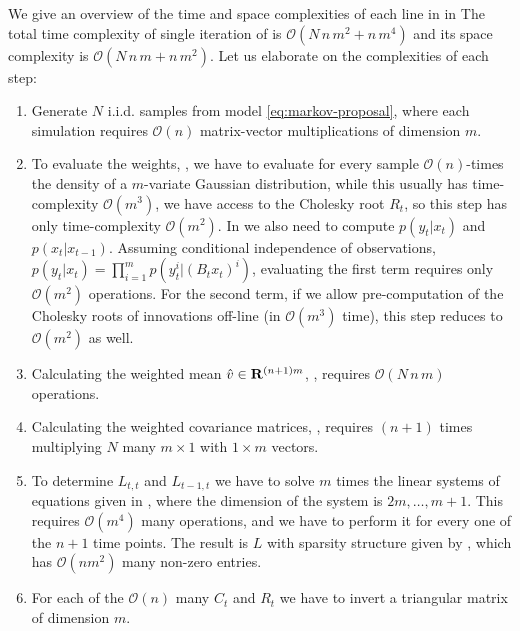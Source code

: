 We give an overview of the time and space complexities of each line in  in 
The total time complexity of single iteration of  is $\mathcal O \left( N\,n\,m^{2} + n\,m^{4}\right)$ and its space complexity is $\mathcal O \left( N\,n\,m + n\,m^{2}\right)$. Let us elaborate on the complexities of each step:
\begin{enumerate}
    \item[\Cref{step:cem-simulate}] Generate $N$ i.i.d. samples from model \eqref{eq:markov-proposal}, where each simulation requires $\mathcal O(n)$ matrix-vector multiplications of dimension $m$. 
    \item[\Cref{step:cem-weights}] To evaluate the weights, , we have to evaluate for every sample $\mathcal O(n)$-times the density of a $m$-variate Gaussian distribution, while this usually has time-complexity $\mathcal O(m^{3})$, we have access to the Cholesky root $R_{t}$, so this step has only time-complexity $\mathcal O(m^{2})$. In  we also need to compute $p(y_{t}|x_{t})$ and $p(x_{t}|x_{t - 1})$. Assuming conditional independence of observations, $p(y_{t}|x_{t}) = \prod_{i = 1}^{m}p(y_{t}^i|(B_{t}x_{t})^{i})$, evaluating the first term requires only $\mathcal O(m^{2})$ operations. For the second term, if we allow pre-computation of the Cholesky roots of innovations off-line (in $\mathcal O(m^{3})$ time), this step reduces to $\mathcal O(m^{2})$ as well.  
    \item[\Cref{step:cem-est_v}] Calculating the weighted mean $\hat v \in\mathbf R^{(n+1)m}$, , requires $\mathcal O(N\,n\,m)$ operations.
    \item[\Cref{step:cem-est_cov}] Calculating the weighted covariance matrices, , requires $(n+1)$ times multiplying $N$ many $m\times 1$ with $1 \times m$ vectors. 
    \item[\Cref{step:cem-L}] To determine $L_{t,t}$ and $L_{t - 1, t}$ we have to solve $m$ times the linear systems of equations given in , where the dimension of the system is $2m,\dots, m + 1$. This requires $\mathcal O(m^{4})$ many operations, and we have to perform it for every one of the $n + 1$ time points. The result is $L$ with sparsity structure given by , which has $\mathcal O (n m^{2})$ many non-zero entries.
    \item[\Cref{step:cem-C_R}] For each of the $\mathcal O(n)$ many $C_{t}$ and $R_{t}$ we have to invert a triangular matrix of dimension $m$. 
\end{enumerate}

